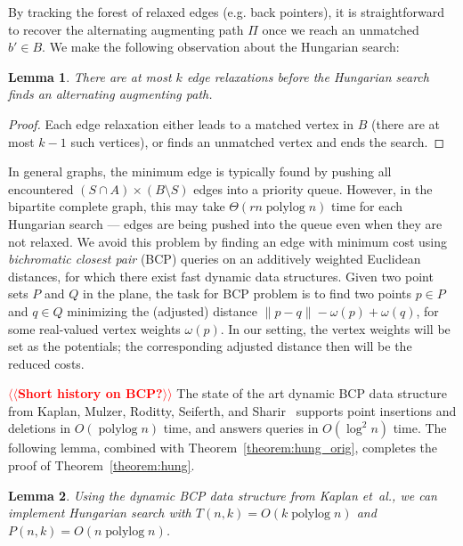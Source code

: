 \documentclass[11pt]{article}
\makeatletter
\def\etal{\textsl{et~al.}}
\def\polylog{\mathop{\mathrm{polylog}}}
\theoremstyle{plain}
\newtheorem{lemma}{Lemma}[section]
\numberwithin{figure}{section}
\def\n@te#1{\textsf{\boldmath \textbf{$\langle\!\langle$#1$\rangle\!\rangle$}}\leavevmode}
\def\note#1{\textcolor{red}{\n@te{#1}}}
\makeatother
\begin{document}
By tracking the forest of relaxed edges (e.g. back pointers), it is
straightforward to recover the alternating augmenting path $\Pi$ once we reach
an unmatched $b' \in B$.
We make the following observation about the Hungarian search:

\begin{lemma}
\label{lemma:hungsearch_length}
There are at most $k$ edge relaxations before the Hungarian search finds an
alternating augmenting path.
\end{lemma}

\begin{proof}
Each edge relaxation either leads to a matched vertex in $B$ (there are at most
$k-1$ such vertices), or finds an unmatched vertex and ends the search.
\end{proof}

In general graphs, the minimum edge is typically found by pushing all
encountered $(S \cap A) \times (B \setminus S)$ edges into a priority queue.
However, in the bipartite complete graph, this may take $\Theta(rn\polylog n)$
time for each Hungarian search --- edges are being pushed into the queue even when
they are not relaxed.
We avoid this problem by finding an edge with minimum cost using \emph{bichromatic
closest pair} (BCP) queries on an additively weighted Euclidean distances,
for which there exist fast %
dynamic data structures.
Given two point sets
$P$ and $Q$ in the plane,
the task for BCP problem is to find two points $p \in P$ and $q \in Q$ minimizing the (adjusted) distance
$\|p - q\| - \omega(p) + \omega(q)$, for some real-valued vertex weights
$\omega(p)$.
In our setting, the vertex weights will be set as the potentials; the corresponding adjusted distance then will be the reduced costs.

\note{Short history on BCP?}
The state of the art dynamic BCP data structure from Kaplan, Mulzer,
Roditty, Seiferth, and Sharir~\cite{KMRSS17} supports point insertions and deletions in
$O(\polylog n)$ time, and answers queries in $O(\log^2 n)$ time.
The following lemma, combined with Theorem~\ref{theorem:hung_orig}, completes
the proof of Theorem~\ref{theorem:hung}.

\begin{lemma}
\label{lemma:hs_time}
Using the dynamic BCP data structure from Kaplan \etal, we can implement
Hungarian search with $T(n, k) = O(k\polylog n)$ and
$P(n, k) = O(n\polylog n)$.
\end{lemma}
\end{document}
